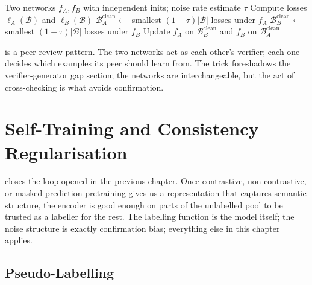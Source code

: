 \begin{algorithm}[H]
\caption{Co-teaching}
\begin{algorithmic}[1]
\Require Two networks $f_A, f_B$ with independent inits; noise rate estimate $\tau$
    \State Compute losses $\ell_A(\mathcal{B})$ and $\ell_B(\mathcal{B})$
    \State $\mathcal{B}_A^{\text{clean}} \gets$ smallest $(1 - \tau)|\mathcal{B}|$ losses under $f_A$
    \State $\mathcal{B}_B^{\text{clean}} \gets$ smallest $(1 - \tau)|\mathcal{B}|$ losses under $f_B$
    \State Update $f_A$ on $\mathcal{B}_B^{\text{clean}}$ and $f_B$ on $\mathcal{B}_A^{\text{clean}}$
\EndFor
\end{algorithmic}
\end{algorithm}

 is a peer-review pattern. The two networks act as each other's verifier; each one decides which examples its peer should learn from. The trick foreshadows the verifier-generator gap section; the networks are interchangeable, but the act of cross-checking is what avoids confirmation.


\newpage
\section{Self-Training and Consistency Regularisation}


 closes the loop opened in the previous chapter. Once contrastive, non-contrastive, or masked-prediction pretraining gives us a representation that captures semantic structure, the encoder is good enough on parts of the unlabelled pool to be trusted as a labeller for the rest. The labelling function is the model itself; the noise structure is exactly confirmation bias; everything else in this chapter applies.

\subsection{Pseudo-Labelling}

